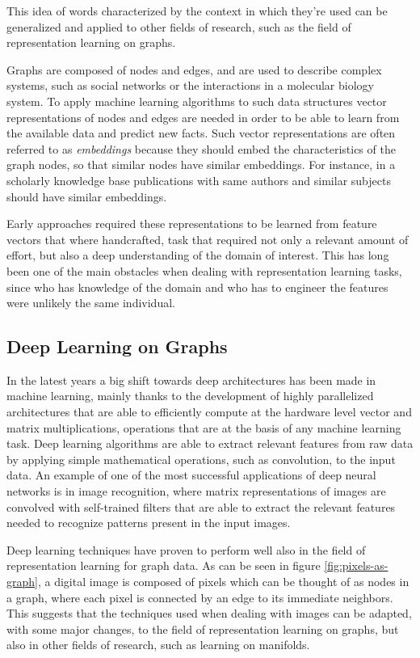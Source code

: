 \documentclass[%
    corpo=13.5pt,
    twoside,
    oldstyle,
    tipotesi=magistrale,
    greek,
    evenboxes
]{toptesi}
\begin{document}
This idea of words characterized by the context in which they're used
can be generalized and applied to other fields of research, such as
the field of representation learning on graphs.

Graphs are composed of nodes and edges, and are used to describe complex
systems, such as social networks or the interactions in a molecular biology
system. To apply machine learning algorithms to such data structures
vector representations of nodes and edges are needed in order
to be able to learn from the available data and predict new facts.
Such vector representations are often referred to as \emph{embeddings} because
they should embed the characteristics of the graph nodes, so that similar nodes
have similar embeddings. For instance, in a scholarly knowledge base publications
with same authors and similar subjects should have similar embeddings.

Early approaches required these representations to be learned from feature
vectors that where handcrafted, task that required not
only a relevant amount of effort, but also a deep understanding of the domain
of interest. This has long been one of the main obstacles when dealing with
representation learning tasks, since who has knowledge of the domain and who
has to engineer the features were unlikely the same individual.


\subsection{Deep Learning on Graphs}

In the latest years a big shift towards deep architectures has been made
in machine learning, mainly thanks to the development of highly
parallelized architectures that are able to efficiently compute
at the hardware level vector and matrix multiplications, operations that
are at the basis of any machine learning task.
Deep learning algorithms are able to extract relevant features from
raw data by applying simple mathematical operations, such as convolution, to
the input data.
An example of one of the most successful applications of deep neural networks
is in image recognition, where matrix representations of images are
convolved with self-trained filters that are able to
extract the relevant features needed to recognize patterns present
in the input images.

Deep learning techniques have proven to perform well also in the field of
representation learning for graph data.
As can be seen in figure \ref{fig:pixels-as-graph}, a digital image
is composed of pixels which can be thought of as nodes in a graph, where
each pixel is connected by an edge to its immediate neighbors. This suggests
that the techniques used when dealing with images can be adapted, with
some major changes, to the field of representation learning on graphs, but
also in other fields of research, such as learning on manifolds.
\end{document}
